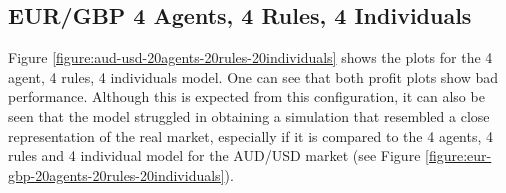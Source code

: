 \newpage

\subsection{EUR/GBP 4 Agents, 4 Rules, 4 Individuals}
\label{results:forecast-eur-gbp-4agents-4rules-4individuals}

Figure \ref{figure:aud-usd-20agents-20rules-20individuals} shows the plots for
the 4 agent, 4 rules, 4 individuals model. One can see that both profit plots
show bad performance. Although this is expected from this configuration, it can
also be seen that the model struggled in obtaining a simulation that resembled a
close representation of the real market, especially if it is compared to the 4
agents, 4 rules and 4 individual model for the AUD/USD market (see Figure
\ref{figure:eur-gbp-20agents-20rules-20individuals}).

